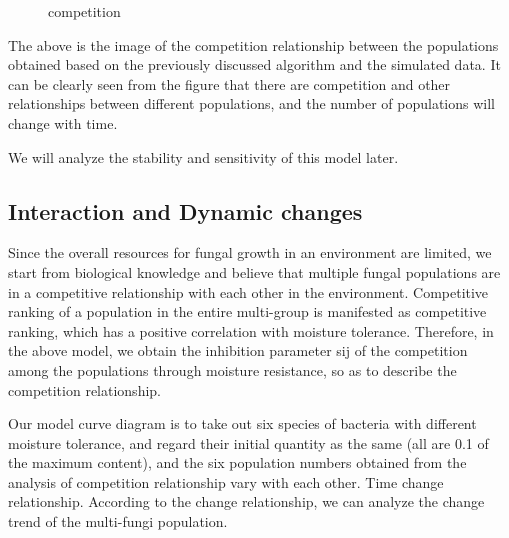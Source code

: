 \documentclass{mcmthesis}
\begin{document}
\begin{figure}[h]
	\caption{competition}
\end{figure}

The above is the image of the competition relationship between the populations obtained based on the previously discussed algorithm and the simulated data. It can be clearly seen from the figure that there are competition and other relationships between different populations, and the number of populations will change with time.

We will analyze the stability and sensitivity of this model later.
\subsection{Interaction and Dynamic changes}
Since the overall resources for fungal growth in an environment are limited, we start from biological knowledge and believe that multiple fungal populations are in a competitive relationship with each other in the environment. Competitive ranking of a population in the entire multi-group is manifested as competitive ranking, which has a positive correlation with moisture tolerance. Therefore, in the above model, we obtain the inhibition parameter sij of the competition among the populations through moisture resistance, so as to describe the competition relationship.

Our model curve diagram is to take out six species of bacteria with different moisture tolerance, and regard their initial quantity as the same (all are 0.1 of the maximum content), and the six population numbers obtained from the analysis of competition relationship vary with each other. Time change relationship. According to the change relationship, we can analyze the change trend of the multi-fungi population. 
\end{document}
